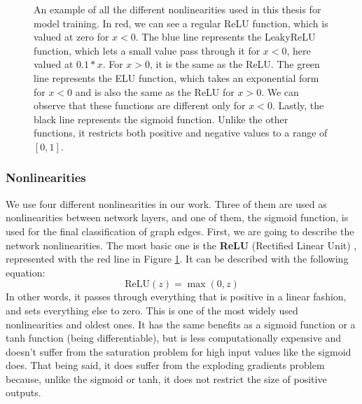 \documentclass[times, utf8, diplomski, english]{fer_eng}
\begin{document}
\begin{figure}
	\centering
\caption{An example of all the different nonlinearities used in this thesis for model training. In red, we can see a regular ReLU function, which is valued at zero for $x<0$. The blue line represents the LeakyReLU function, which lets a small value pass through it for $x<0$, here valued at $0.1*x$. For $x>0$, it is the same as the ReLU. The green line represents the ELU function, which takes an exponential form for $x<0$ and is also the same as the ReLU for $x>0$. We can observe that these functions are different only for $x<0$. Lastly, the black line represents the sigmoid function. Unlike the other functions, it restricts both positive and negative values to a range of $[0,1]$.}
\label{fig:nonlinearities}
\end{figure}

\subsubsection{Nonlinearities}
\label{subsubsec: nonlinearities}

We use four different nonlinearities in our work. Three of them are used as nonlinearities between network layers, and one of them, the sigmoid function, is used for the final classification of graph edges. First, we are going to describe the network nonlinearities. The most basic one is the \textbf{ReLU} (Rectified Linear Unit) \cite{relu}, represented with the red line in Figure \ref{fig:nonlinearities}. It can be described with the following equation:
\[ \mathrm{ReLU}(z) = \max (0, z) \]
In other words, it passes through everything that is positive in a linear fashion, and sets everything else to zero. This is one of the most widely used nonlinearities and oldest ones. It has the same benefits as a sigmoid function or a tanh function (being differentiable), but is less computationally expensive and doesn't suffer from the saturation problem for high input values like the sigmoid does. That being said, it does suffer from the exploding gradients problem because, unlike the sigmoid or tanh, it does not restrict the size of positive outputs.
\end{document}
